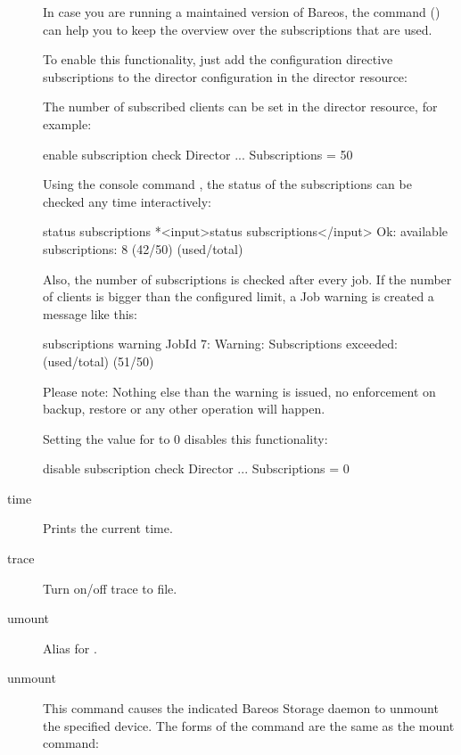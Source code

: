 \begin{description}
In case you are running a maintained version of Bareos,
the command  () can help you to keep the overview over the subscriptions
that are used.

To enable this functionality, just add the configuration directive subscriptions to the director configuration in the director resource:

The number of subscribed clients can be set in
the director resource, for example:
\begin{bconfig}{enable subscription check}
Director {
   ...
   Subscriptions = 50
}
\end{bconfig}

Using the console command , the status of
the subscriptions can be checked any time interactively:

\begin{bconsole}{status subscriptions}
*<input>status subscriptions</input>
Ok: available subscriptions: 8 (42/50) (used/total)
\end{bconsole}

Also, the number of subscriptions is checked after every job.
If the number of clients is bigger than the configured limit, a Job warning is
created a message like this:
\begin{bconsole}{subscriptions warning}
JobId 7: Warning: Subscriptions exceeded: (used/total) (51/50)
\end{bconsole}

Please note: Nothing else than the warning is issued, no enforcement on
backup, restore or any other operation will happen.

Setting the value for  to 0 disables this functionality:
\begin{bconfig}{disable subscription check}
Director {
   ...
   Subscriptions = 0
}
\end{bconfig}


\item [time]
   Prints the current time.

\item [trace]
   Turn on/off trace to file.

\item [umount]
   Alias for .

\item [unmount]
   This command causes the indicated Bareos Storage  daemon to unmount the
   specified device. The forms of the command  are the same as the mount command:


\end{description}
